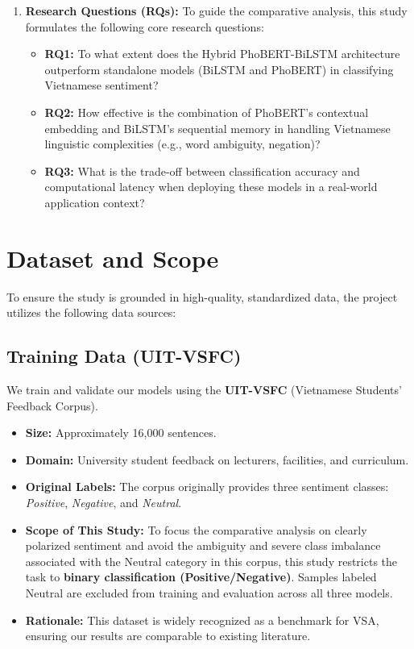 \documentclass[12pt]{report} %
\begin{document}
\begin{enumerate}
    \item \textbf{Research Questions (RQs):}
    To guide the comparative analysis, this study formulates the following core research questions:
    \begin{itemize}
        \item \textbf{RQ1:} To what extent does the Hybrid PhoBERT-BiLSTM architecture outperform standalone models (BiLSTM and PhoBERT) in classifying Vietnamese sentiment?
        \item \textbf{RQ2:} How effective is the combination of PhoBERT's contextual embedding and BiLSTM's sequential memory in handling Vietnamese linguistic complexities (e.g., word ambiguity, negation)?
        \item \textbf{RQ3:} What is the trade-off between classification accuracy and computational latency when deploying these models in a real-world application context?
    \end{itemize}
\end{enumerate}

\section{Dataset and Scope}
To ensure the study is grounded in high-quality, standardized data, the project utilizes the following data sources:

\subsection{Training Data (UIT-VSFC)}
We train and validate our models using the \textbf{UIT-VSFC} (Vietnamese Students' Feedback Corpus).
\begin{itemize}
    \item \textbf{Size:} Approximately 16,000 sentences.
    \item \textbf{Domain:} University student feedback on lecturers, facilities, and curriculum.
    \item \textbf{Original Labels:} The corpus originally provides three sentiment classes: \textit{Positive}, \textit{Negative}, and \textit{Neutral}.
    \item \textbf{Scope of This Study:} To focus the comparative analysis on clearly polarized sentiment and avoid the ambiguity and severe class imbalance associated with the Neutral category in this corpus, this study restricts the task to \textbf{binary classification (Positive/Negative)}. Samples labeled Neutral are excluded from training and evaluation across all three models.
    \item \textbf{Rationale:} This dataset is widely recognized as a benchmark for VSA, ensuring our results are comparable to existing literature.
\end{itemize}
\end{document}
